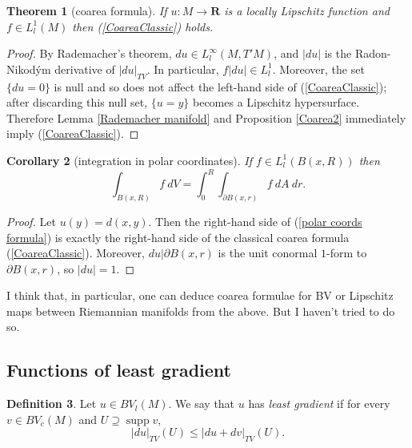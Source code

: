 \documentclass[reqno,12pt,letterpaper]{amsart}
\newcommand{\RR}{\mathbf{R}}
\DeclareMathOperator{\supp}{supp}
\newcommand{\dfn}[1]{\emph{#1}\index{#1}}
\newtheorem{theorem}{Theorem}[section]
\newtheorem{corollary}[theorem]{Corollary}
\theoremstyle{definition}
\newtheorem{definition}[theorem]{Definition}
\numberwithin{equation}{section}
\begin{document}
\begin{theorem}[coarea formula]
If $u: M \to \RR$ is a locally Lipschitz function and $f \in L^1_l(M)$ then (\ref{CoareaClassic}) holds.
\end{theorem}
\begin{proof}
By Rademacher's theorem, $du \in L^\infty_l(M, T'M)$, and $|du|$ is the Radon-Nikod\'ym derivative of $|du|_{TV}$.
In particular, $f|du| \in L^1_l$.
Moreover, the set $\{du = 0\}$ is null and so does not affect the left-hand side of (\ref{CoareaClassic}); after discarding this null set, $\{u = y\}$ becomes a Lipschitz hypersurface.
Therefore Lemma \ref{Rademacher manifold} and Proposition \ref{Coarea2} immediately imply (\ref{CoareaClassic}).
\end{proof}

\begin{corollary}[integration in polar coordinates]\label{polar coords}
If $f \in L^1_l(B(x, R))$ then
\begin{equation}\label{polar coords formula}
\int_{B(x, R)} f ~dV = \int_0^R \int_{\partial B(x, r)} f ~dA ~dr.
\end{equation}
\end{corollary}
\begin{proof}
Let $u(y) = d(x, y)$. Then the right-hand side of (\ref{polar coords formula}) is exactly the right-hand side of the classical coarea formula (\ref{CoareaClassic}).
Moreover, $du|\partial B(x, r)$ is the unit conormal $1$-form to $\partial B(x, r)$, so $|du| = 1$.
\end{proof}

I think that, in particular, one can deduce coarea formulae for BV or Lipschitz maps between Riemannian manifolds from the above.
But I haven't tried to do so.

\subsection{Functions of least gradient}
\begin{definition}
Let $u \in BV_l(M)$. We say that $u$ has \dfn{least gradient} if for every $v \in BV_c(M)$ and $U \supseteq \supp v$,
$$|d u|_{TV}(U) \leq |d u + d v|_{TV}(U).$$
\end{definition}
\end{document}
